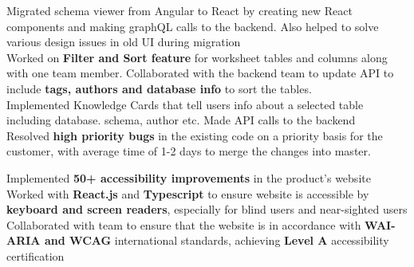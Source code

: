 \documentclass[]{Nikhil_Kadiyan_Resume}
\begin{document}
\sectionsep

\pt Migrated schema viewer from Angular to React by creating new React components and making graphQL calls to the backend. Also helped to solve various design issues in old UI during migration\\
\pt Worked on \textbf{Filter and Sort feature} for worksheet tables and columns along with one team member. Collaborated with the backend team to update API to include \textbf{tags, authors and database info} to sort the tables.\\
\pt Implemented Knowledge Cards that tell users info about a selected table including database. schema, author etc. Made API calls to the backend\\
\pt Resolved \textbf{high priority bugs} in the existing code on a priority basis for the customer, with average time of 1-2 days to merge the changes into master. \\
\sectionsep

\pt Implemented \textbf{50+ accessibility improvements} in the product's website\\
\pt Worked with \textbf{React.js} and \textbf{Typescript} to ensure website is accessible by \textbf{keyboard and screen readers}, especially for blind users and near-sighted users\\
\pt Collaborated with team to ensure that the website is in accordance with \textbf{WAI-ARIA and WCAG} international standards, achieving \textbf{Level A}  accessibility certification\\
\sectionsep
\end{document}
